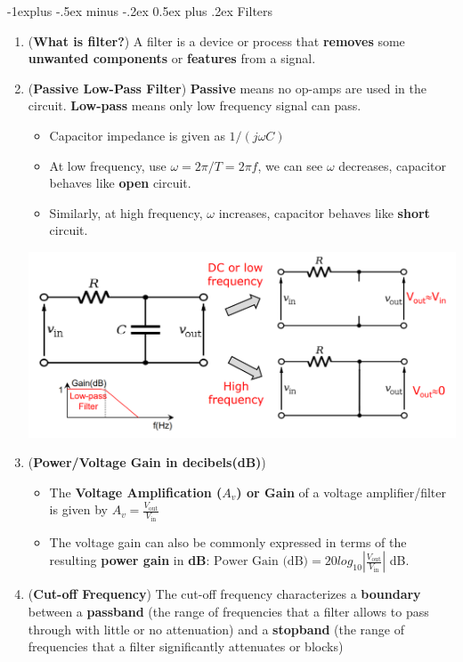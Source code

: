 \documentclass[10pt, landscape]{article}
\makeatletter
\renewcommand{\subsection}{\@startsection{subsection}{2}{0mm}%
                                {-1explus -.5ex minus -.2ex}%
                                {0.5ex plus .2ex}%
                                {\normalfont\normalsize\bfseries}}
\makeatother
\begin{document}
\begin{multicols}{4}
\subsection{Filters}
\begin{enumerate}
    \item (\textbf{What is filter?}) A filter is a device or process that \textbf{removes} some \textbf{unwanted components} or \textbf{features} from a signal.
    \item (\textbf{Passive Low-Pass Filter}) \textbf{Passive} means no op-amps are used in the circuit. \textbf{Low-pass} means only low frequency signal can pass.
    \begin{itemize}
        \item Capacitor impedance is given as $1/(j\omega C)$
        \item At low frequency, use $\omega = 2\pi / T=2\pi f$, we can see $\omega$ decreases, capacitor behaves like \textbf{open} circuit.
        \item Similarly, at high frequency, $\omega$ increases, capacitor behaves like \textbf{short} circuit.
    \end{itemize}
    \centerline{\includegraphics[width=0.9\linewidth]{images/passive-low-pass-filter.png}}
    \item (\textbf{Power/Voltage Gain in decibels(dB)})
    \begin{itemize}
        \item The \textbf{Voltage Amplification ($A_v$) or Gain} of a voltage amplifier/filter is given by $A_v=\frac{V_{\text{out}}}{V_{\text{in}}}$
        \item The voltage gain can also be commonly expressed in terms of the resulting \textbf{power gain} in \textbf{dB}: $\text{Power Gain (dB)}=20log_{10}|\frac{V_{\text{out}}}{V_{\text{in}}}|$ dB.
    \end{itemize}
    \item (\textbf{Cut-off Frequency}) The cut-off frequency characterizes a \textbf{boundary} between a \textbf{passband} (the range of frequencies that a filter allows to pass through with little or no attenuation) and a \textbf{stopband} (the range of frequencies that a filter significantly attenuates or blocks)

\end{enumerate}
\end{multicols}
\end{document}
